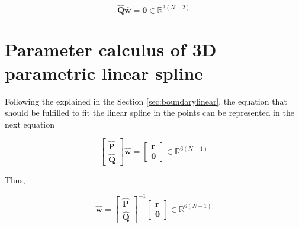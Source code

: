 \begin{equation}
\mathbf{\hat{Q}}
\mathbf{\hat{w}}
=\mathbf{0}\in \mathbb{R}^{3(N-2)}
\end{equation}


\section{Parameter calculus of 3D parametric linear spline}

Following the explained in the Section \ref{sec:boundarylinear},
the equation that should be fulfilled to fit the linear spline in the points can be represented in the next equation

\begin{equation}
\begin{bmatrix}
\mathbf{\hat{P}}\\
\mathbf{\hat{Q}}
\end{bmatrix}
\mathbf{\hat{w}}
=
\begin{bmatrix}
\mathbf{r}\\
\mathbf{0}
\end{bmatrix}
\in \mathbb{R}^{6(N-1)}
\end{equation}

Thus,

\begin{equation}
\mathbf{\hat{w}}
=
\begin{bmatrix}
\mathbf{\hat{P}}\\
\mathbf{\hat{Q}}
\end{bmatrix}^{-1}
\begin{bmatrix}
\mathbf{r}\\
\mathbf{0}
\end{bmatrix}
\in \mathbb{R}^{6(N-1)}
\end{equation}
